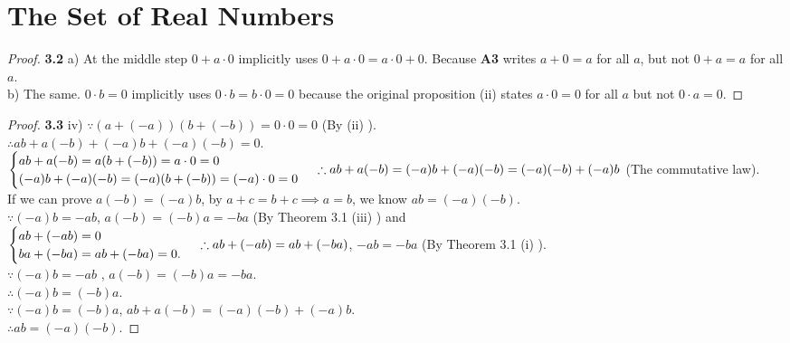 \documentclass{article}
\begin{document}
\section{The Set of Real Numbers}
\begin{proof}
\textbf{3.2} a) At the middle step $0 + a \cdot 0$ implicitly uses $0 + a \cdot 0 = a \cdot 0 + 0$. Because \textbf{A3} writes $a + 0 = a $ for all $a$, but not $0 + a = a$ for all $a$.
\\ b) The same. $0 \cdot b = 0$ implicitly uses $0 \cdot b = b \cdot 0 = 0$ because the original proposition (ii) states $a \cdot 0 = 0$ for all $a$ but not $0 \cdot a = 0$.
\end{proof}
\begin{proof}
\textbf{3.3} iv) $\because (a+(-a))(b+(-b)) = 0 \cdot 0 = 0$ (By (ii) ).
\\$\therefore ab + a(-b) + (-a)b + (-a)(-b) = 0$.
\\$
\begin{cases}
ab + a(-b) = a(b + (-b) ) = a \cdot 0 = 0
\\ (-a)b + (-a)(-b) = (-a)(b + (-b) ) = (-a) \cdot 0 = 0
\end{cases}
\\ \therefore ab + a(-b) = (-a)b + (-a)(-b) = (-a)(-b) + (-a)b
$ (The commutative law).
\\ If we can prove $a(-b) = (-a)b$, by $a + c = b + c \implies a = b$, we know $ab = (-a)(-b)$.
\\ $\because (-a)b = -ab$, $a(-b)=(-b)a=-ba$ (By Theorem 3.1 (iii) ) and 
\\ $ 
\begin{cases}
ab + (-ab) = 0
\\ ba + (-ba) = ab + (-ba) = 0.
\end{cases}
\\ \therefore ab + (-ab) = ab + (-ba)$, $-ab = -ba$ (By Theorem 3.1 (i) ).
\\ $\because (-a)b = -ab$ , $a(-b) = (-b)a = -ba$.
\\ $\therefore (-a)b = (-b)a$.
\\ $\because (-a)b = (-b)a$, $ab + a(-b) = (-a)(-b) + (-a)b$.
\\ $\therefore ab = (-a)(-b)$.
\end{proof}
\end{document}
